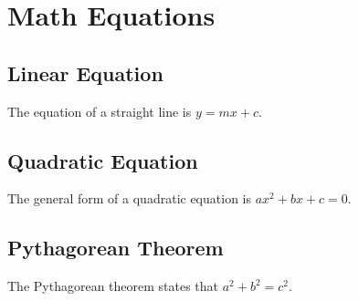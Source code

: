 \documentclass[12pt]{article}
\begin{document}
\section{Math Equations}

\subsection{Linear Equation}
The equation of a straight line is \(y = mx + c\).

\subsection{Quadratic Equation}
The general form of a quadratic equation is \(ax^2 + bx + c = 0\).

\subsection{Pythagorean Theorem}
The Pythagorean theorem states that \(a^2 + b^2 = c^2\).
\end{document}
